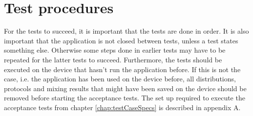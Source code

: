 \chapter{Test procedures}
\label{chap:testProcedures}
For the tests to succeed, it is important that the tests are done in order. It is also important that the application is not closed between tests, unless a test states something else. Otherwise some steps done in earlier tests may have to be repeated for the latter tests to succeed. Furthermore, the tests should be executed on the device that hasn't run the application before. If this is not the case, i.e. the application has been used on the device before, all distributions, protocols and mixing results that might have been saved on the device should be removed before starting the acceptance tests. The set up required to execute the acceptance tests from chapter \ref{chap:testCaseSpecs} is described in appendix A. 
